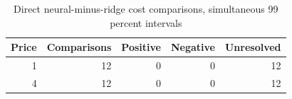 \begin{table}[htbp]
\centering\small
\caption{Direct neural-minus-ridge cost comparisons, simultaneous 99 percent intervals}
\label{tab:paired}
\begin{tabular}{rrrrr}
\toprule
Price & Comparisons & Positive & Negative & Unresolved\\
\midrule
1 & 12 & 0 & 0 & 12\\
4 & 12 & 0 & 0 & 12\\
\bottomrule
\end{tabular}
\end{table}
